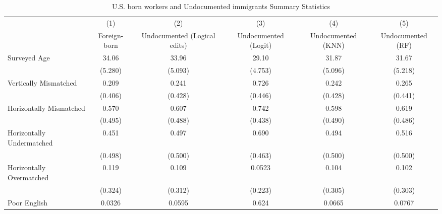 \begin{table}[htbp]\centering
\def\sym#1{\ifmmode^{#1}\else\(^{#1}\)\fi}
\caption{U.S. born workers and Undocumented immigrants Summary Statistics \label{tab:sum}}
\begin{tabular}{l*{5}{c}}
\hline\hline
                    &\multicolumn{1}{c}{(1)}         &\multicolumn{1}{c}{(2)}         &\multicolumn{1}{c}{(3)}         &\multicolumn{1}{c}{(4)}         &\multicolumn{1}{c}{(5)}         \\
                    &Foreign-born         &Undocumented (Logical edits)         &Undocumented (Logit)         &Undocumented (KNN)         &Undocumented (RF)         \\
\hline
Surveyed Age        &       34.06         &       33.96         &       29.10         &       31.87         &       31.67         \\
                    &     (5.280)         &     (5.093)         &     (4.753)         &     (5.096)         &     (5.218)         \\
[1em]
Vertically Mismatched&       0.209         &       0.241         &       0.726         &       0.242         &       0.265         \\
                    &     (0.406)         &     (0.428)         &     (0.446)         &     (0.428)         &     (0.441)         \\
[1em]
Horizontally Mismatched&       0.570         &       0.607         &       0.742         &       0.598         &       0.619         \\
                    &     (0.495)         &     (0.488)         &     (0.438)         &     (0.490)         &     (0.486)         \\
[1em]
Horizontally Undermatched&       0.451         &       0.497         &       0.690         &       0.494         &       0.516         \\
                    &     (0.498)         &     (0.500)         &     (0.463)         &     (0.500)         &     (0.500)         \\
[1em]
Horizontally Overmatched&       0.119         &       0.109         &      0.0523         &       0.104         &       0.102         \\
                    &     (0.324)         &     (0.312)         &     (0.223)         &     (0.305)         &     (0.303)         \\
[1em]
Poor English        &      0.0326         &      0.0595         &       0.624         &      0.0665         &      0.0767         \\

\end{tabular}
\end{table}
